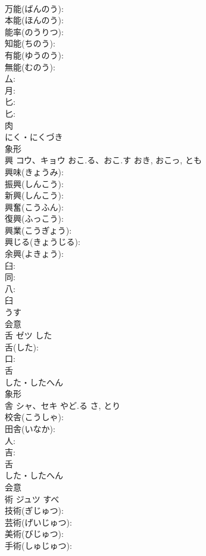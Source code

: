 \documentclass[8pt]{extreport}
\begin{document}
\begin{CJK}{UTF8}{min}
\\	万能(ばんのう): 
\\	本能(ほんのう): 
\\	能率(のうりつ): 
\\	知能(ちのう): 
\\	有能(ゆうのう): 
\\	無能(むのう): 
\\	厶: 
\\	月: 
\\	匕: 
\\	匕: 
\\	肉	
\\	にく・にくづき	
\\	象形 
\\	興	コウ、キョウ	おこ.る、おこ.す	おき, おこっ, とも	
\\	興味(きょうみ): 
\\	振興(しんこう): 
\\	新興(しんこう): 
\\	興奮(こうふん): 
\\	復興(ふっこう): 
\\	興業(こうぎょう): 
\\	興じる(きょうじる): 
\\	余興(よきょう): 
\\	臼: 
\\	同: 
\\	八: 
\\	臼	
\\	うす	
\\	会意 
\\	舌	ゼツ	した		
\\	舌(した): 
\\	口: 
\\	舌	
\\	した・したへん	
\\	象形 
\\	舎	シャ、セキ	やど.る	さ, とり	
\\	校舎(こうしゃ): 
\\	田舎(いなか): 
\\	人: 
\\	吉: 
\\	舌	
\\	した・したへん	
\\	会意 
\\	術	ジュツ	すべ		
\\	技術(ぎじゅつ): 
\\	芸術(げいじゅつ): 
\\	美術(びじゅつ): 
\\	手術(しゅじゅつ): 

\end{CJK}
\end{document}
